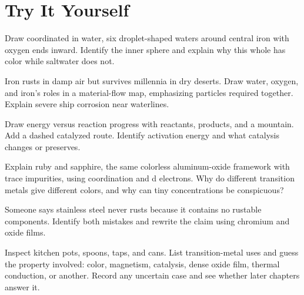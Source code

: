 \section*{Try It Yourself}

\begin{sikaoti}
\item Draw coordinated  in water, six droplet-shaped waters around central iron with oxygen ends inward. Identify the inner sphere and explain why this whole has color while saltwater does not.
\item Iron rusts in damp air but survives millennia in dry deserts. Draw water, oxygen, and iron's roles in a material-flow map, emphasizing particles required together. Explain severe ship corrosion near waterlines.
\item Draw energy versus reaction progress with reactants, products, and a mountain. Add a dashed catalyzed route. Identify activation energy and what catalysis changes or preserves.
\item Explain ruby and sapphire, the same colorless aluminum-oxide framework with trace impurities, using coordination and d electrons. Why do different transition metals give different colors, and why can tiny concentrations be conspicuous?
\item Someone says stainless steel never rusts because it contains no rustable components. Identify both mistakes and rewrite the claim using chromium and oxide films.
\item Inspect kitchen pots, spoons, taps, and cans. List transition-metal uses and guess the property involved: color, magnetism, catalysis, dense oxide film, thermal conduction, or another. Record any uncertain case and see whether later chapters answer it.
\end{sikaoti}
